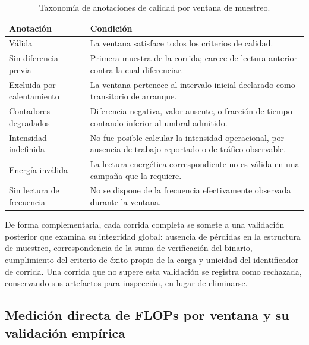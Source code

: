 \documentclass[12pt,oneside,spanish]{book}
\begin{document}
\begin{table}[H]
\centering
\caption[Taxonomía de anotaciones de calidad]{Taxonomía de anotaciones de calidad por ventana de muestreo.}
\label{tab:calidad}
\begin{tabular}{@{}p{4.3cm}p{10.2cm}@{}}
\toprule
\textbf{Anotación} & \textbf{Condición} \\
\midrule
Válida & La ventana satisface todos los criterios de calidad. \\
Sin diferencia previa & Primera muestra de la corrida; carece de lectura anterior contra la cual diferenciar. \\
Excluida por calentamiento & La ventana pertenece al intervalo inicial declarado como transitorio de arranque. \\
Contadores degradados & Diferencia negativa, valor ausente, o fracción de tiempo contando inferior al umbral admitido. \\
Intensidad indefinida & No fue posible calcular la intensidad operacional, por ausencia de trabajo reportado o de tráfico observable. \\
Energía inválida & La lectura energética correspondiente no es válida en una campaña que la requiere. \\
Sin lectura de frecuencia & No se dispone de la frecuencia efectivamente observada durante la ventana. \\
\bottomrule
\end{tabular}
\end{table}

De forma complementaria, cada corrida completa se somete a una validación posterior que examina su integridad global: ausencia de pérdidas en la estructura de muestreo, correspondencia de la suma de verificación del binario, cumplimiento del criterio de éxito propio de la carga y unicidad del identificador de corrida. Una corrida que no supere esta validación se registra como rechazada, conservando sus artefactos para inspección, en lugar de eliminarse.

\subsection{Medición directa de FLOPs por ventana y su validación empírica}
\label{sec:validacion-flops}
\end{document}
